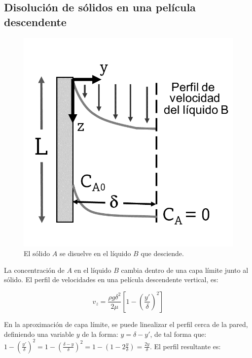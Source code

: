 \subsection{Disolución de sólidos en una película descendente}

\begin{figure}[H]
	\centering
	\includegraphics[scale=0.2]{./Capitulo2/Imagenes/fig-2-7.PNG}
	\caption{El sólido $A$ se disuelve en el líquido $B$ que desciende.}
\end{figure}

La concentración de $A$ en el líquido $B$ cambia dentro de una capa límite junto al sólido. El perfil de velocidades en una película descendente vertical, es:

\begin{equation}
	v_z = \frac{\rho g \delta^2}{2 \mu} \left[ 1 - \left( \frac{y'}{\delta} \right)^2 \right]
\end{equation}

En la aproximación de capa límite, se puede linealizar el perfil cerca de la pared, definiendo una variable $y$ de la forma: $y = \delta - y'$, de tal forma que: $1- \left( \frac{y'}{\delta} \right)^2 = 1 - \left( \frac{\delta - y}{\delta} \right)^2 = 1 - \left( 1- 2 \frac{y}{\delta} \right) =  \frac{2y}{\delta}$.  El perfil resultante es:

